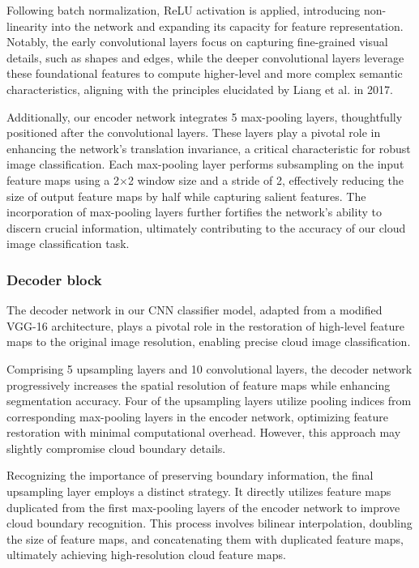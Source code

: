 \documentclass[amt, article]{copernicus}
\begin{document}
Following batch normalization, ReLU activation is applied, introducing non-linearity into the network and expanding its capacity for feature representation. Notably, the early convolutional layers focus on capturing fine-grained visual details, such as shapes and edges, while the deeper convolutional layers leverage these foundational features to compute higher-level and more complex semantic characteristics, aligning with the principles elucidated by Liang et al. in 2017.

Additionally, our encoder network integrates 5 max-pooling layers, thoughtfully positioned after the convolutional layers. These layers play a pivotal role in enhancing the network's translation invariance, a critical characteristic for robust image classification. Each max-pooling layer performs subsampling on the input feature maps using a 2$\times$2 window size and a stride of 2, effectively reducing the size of output feature maps by half while capturing salient features. The incorporation of max-pooling layers further fortifies the network's ability to discern crucial information, ultimately contributing to the accuracy of our cloud image classification task.

\subsubsection{Decoder block}

The decoder network in our CNN classifier model, adapted from a modified VGG-16 architecture, plays a pivotal role in the restoration of high-level feature maps to the original image resolution, enabling precise cloud image classification.

Comprising 5 upsampling layers and 10 convolutional layers, the decoder network progressively increases the spatial resolution of feature maps while enhancing segmentation accuracy. Four of the upsampling layers utilize pooling indices from corresponding max-pooling layers in the encoder network, optimizing feature restoration with minimal computational overhead. However, this approach may slightly compromise cloud boundary details.

Recognizing the importance of preserving boundary information, the final upsampling layer employs a distinct strategy. It directly utilizes feature maps duplicated from the first max-pooling layers of the encoder network to improve cloud boundary recognition. This process involves bilinear interpolation, doubling the size of feature maps, and concatenating them with duplicated feature maps, ultimately achieving high-resolution cloud feature maps.
\end{document}

